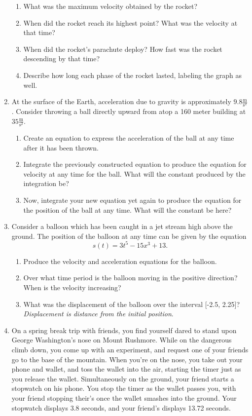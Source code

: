 \documentclass{ximera}
\begin{document}
\begin{enumerate}
\begin{figure}[H]
\end{figure}
\begin{enumerate}
\item{What was the maximum velocity obtained by the rocket?}
\item{When did the rocket reach its highest point? What was the velocity at that time?}
\item{When did the rocket's parachute deploy? How fast was the rocket descending by that time?}
\item{Describe how long each phase of the rocket lasted, labeling the graph as well.}
\end{enumerate}
\item{At the surface of the Earth, acceleration due to gravity is approximately $9.8 \frac{\text{m}}{\text{s}^2}$. Consider throwing a ball directly upward from atop a 160 meter building at $35 \frac{\text{m}}{\text{s}^2}$.}
\begin{enumerate}
\item{Create an equation to express the acceleration of the ball at any time after it has been thrown.}
\item{Integrate the previously constructed equation to produce the equation for velocity at any time for the ball. What will the constant produced by the integration be?}
\item{Now, integrate your new equation yet again to produce the equation for the position of the ball at any time. What will the constant be here?}
\end{enumerate}
\item{Consider a balloon which has been caught in a jet stream high above the ground. The position of the balloon at any time can be given by the equation $$s(t) = 3t^5-15x^3+13\text{.}$$}
\begin{enumerate}
\item{Produce the velocity and acceleration equations for the balloon.}
\item{Over what time period is the balloon moving in the positive direction? When is the velocity increasing?}
\item{What was the displacement of the balloon over the interval [-2.5, 2.25]? \textit{Displacement is distance from the initial position}.}
\end{enumerate}
\item{On a spring break trip with friends, you find yourself dared to stand upon George Washington's nose on Mount Rushmore. While on the dangerous climb down, you come up with an experiment, and request one of your friends go to the base of the mountain. When you're on the nose, you take out your phone and wallet, and toss the wallet into the air, starting the timer just as you release the wallet. Simultaneously on the ground, your friend starts a stopwatch on his phone. You stop the timer as the wallet passes you, with your friend stopping their's once the wallet smashes into the ground. Your stopwatch displays 3.8 seconds, and your friend's displays 13.72 seconds.}

\end{enumerate}
\end{document}
